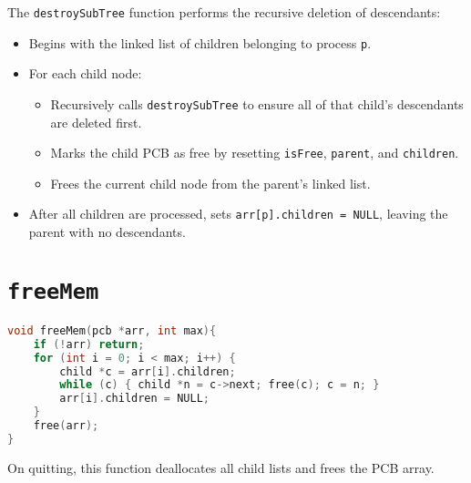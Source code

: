 \documentclass[12pt]{article}
\begin{document}
The \texttt{destroySubTree} function performs the recursive deletion of descendants:

\begin{itemize}
  \item Begins with the linked list of children belonging to process \texttt{p}.
  \item For each child node:
    \begin{itemize}
      \item Recursively calls \texttt{destroySubTree} to ensure all of that child’s 
      descendants are deleted first.
      \item Marks the child PCB as free by resetting \texttt{isFree}, \texttt{parent}, 
      and \texttt{children}.
      \item Frees the current child node from the parent’s linked list.
    \end{itemize}
  \item After all children are processed, sets \texttt{arr[p].children = NULL}, 
  leaving the parent with no descendants.
\end{itemize}



\section*{\texttt{freeMem}}
\begin{lstlisting}[language=C]
void freeMem(pcb *arr, int max){
    if (!arr) return;
    for (int i = 0; i < max; i++) {
        child *c = arr[i].children;
        while (c) { child *n = c->next; free(c); c = n; }
        arr[i].children = NULL;
    }
    free(arr);
}
\end{lstlisting}

On quitting, this function deallocates all child lists and frees the PCB array.
\end{document}
